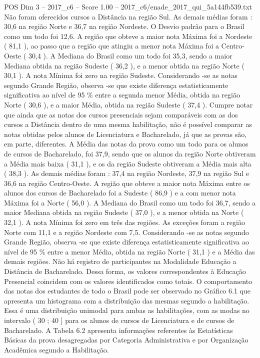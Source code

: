 \begin{textsample}{POS Dim 3 – 2017\_c6 – Score 1.00 – 2017\_c6/enade\_2017\_qui\_5a144fb539.txt}
Não foram oferecidos cursos a Distância na região Sul.
As demais médias foram : 30,6 na região Norte e 36,7 na região Nordeste.
O Desvio padrão para o Brasil como um todo foi 12,6.
A região que obteve a maior nota Máxima foi a Nordeste ( 81,1 ), ao passo que a região que atingiu a menor nota Máxima foi a Centro-Oeste ( 30,4 ).
A Mediana do Brasil como um todo foi 35,3, sendo a maior Mediana obtida na região Sudeste ( 36,2 ), e a menor obtida na região Norte ( 30,1 ).
A nota Mínima foi zero na região Sudeste.
Considerando -se as notas segundo Grande Região, observa -se que existe diferença estatisticamente significativa ao nível de 95 \% entre a segunda menor Média, obtida na região Norte ( 30,6 ), e a maior Média, obtida na região Sudeste ( 37,4 ).
Cumpre notar que ainda que as notas dos cursos presenciais sejam comparáveis com as dos cursos a Distância dentro de uma mesma habilitação, não é possível comparar as notas obtidas pelos alunos de Licenciatura e Bacharelado, já que as provas são, em parte, diferentes.
A Média das notas da prova como um todo para os alunos de cursos de Bacharelado, foi 37,9, sendo que os alunos da região Norte obtiveram a Média mais baixa ( 31,1 ), e os da região Sudeste obtiveram a Média mais alta ( 38,3 ).
As demais médias foram : 37,4 na região Nordeste, 37,9 na região Sul e 36,6 na região Centro-Oeste.
A região que obteve a maior nota Máxima entre os alunos dos cursos de Bacharelado foi a Sudeste ( 86,9 ) e a com menor nota Máxima foi a Norte ( 56,0 ).
A Mediana do Brasil como um todo foi 36,7, sendo a maior Mediana obtida na região Sudeste ( 37,0 ), e a menor obtida na Norte ( 32,1 ).
A nota Mínima foi zero em três das regiões.
As exceções foram a região Norte com 11,1 e a região Nordeste com 7,5.
Considerando -se as notas segundo Grande Região, observa -se que existe diferença estatisticamente significativa ao nível de 95 \% entre a menor Média, obtida na região Norte ( 31,1 ) e a Média das demais regiões.
Não há registro de participantes na Modalidade Educação a Distância de Bacharelado.
Dessa forma, os valores correspondentes à Educação Presencial coincidem com os valores identificados como totais.
O comportamento das notas dos estudantes de todo o Brasil pode ser observado no Gráfico 6.1 que apresenta um histograma com a distribuição das mesmas segundo a habilitação.
Essa é uma distribuição unimodal para ambas as habilitações, com as modas no intervalo ( 30 ; 40 ] para os alunos de cursos de Licenciatura e de cursos de Bacharelado.
A Tabela 6.2 apresenta informações referentes às Estatísticas Básicas da prova desagregadas por Categoria Administrativa e por Organização Acadêmica segundo a Habilitação.

\end{textsample}

